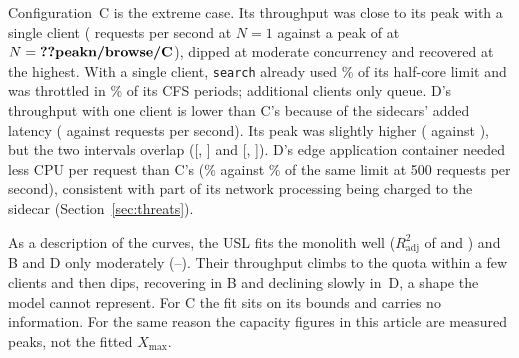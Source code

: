 Configuration~C is the extreme case. Its throughput was close to its peak with a single client
( requests per second at $N=1$ against a peak of  at $N=\xo{peakn/browse/C}$),
dipped at moderate concurrency and recovered at the highest. With a single client, \texttt{search} already used
\% of its half-core limit and was throttled in \% of its CFS
periods; additional clients only queue. D's throughput with one client is lower than C's because of the
sidecars' added latency ( against  requests per second). Its peak was slightly higher ( against ), but the two intervals overlap
([, ] and [, ]). D's edge application container needed less CPU per request than C's (\% against
\% of the same limit at 500 requests per second), consistent with part of its network
processing being charged to the sidecar (Section~\ref{sec:threats}).

As a description of the curves, the USL fits the monolith well ($R^2_{\mathrm{adj}}$ of 
and ) and B and D only moderately (--).
Their throughput climbs to the quota within a few clients and then dips, recovering in B and declining slowly
in~D, a shape the model cannot represent.
For C the fit sits on its bounds and carries no information. For the same reason the capacity figures in this
article are measured peaks, not the fitted $X_{\max}$.
